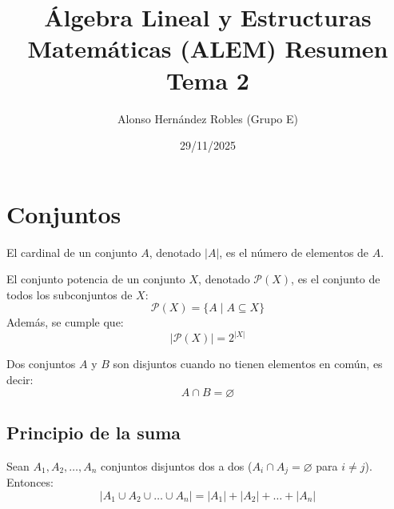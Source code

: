 \documentclass[a4paper,12pt]{article}
\title{Álgebra Lineal y Estructuras Matemáticas (ALEM) Resumen Tema 2}
\author{Alonso Hernández Robles (Grupo E)}
\date{29/11/2025}
\begin{document}
\maketitle

\tableofcontents
\newpage

\section{Conjuntos}

\begin{procedimiento}[title=Cardinal de un conjunto]
El cardinal de un conjunto $A$, denotado $|A|$, es el número de elementos de $A$.
\end{procedimiento}

\begin{procedimiento}[title=Conjunto potencia]
El conjunto potencia de un conjunto $X$, denotado $\mathcal{P}(X)$, es el conjunto de todos los subconjuntos de $X$:
\[
\mathcal{P}(X) = \{ A \mid A \subseteq X \}
\]
Además, se cumple que:
\[
|\mathcal{P}(X)| = 2^{|X|}
\]
\end{procedimiento}

\begin{procedimiento}[title=Conjuntos disjuntos]
Dos conjuntos $A$ y $B$ son disjuntos cuando no tienen elementos en común, es decir:
\[
A \cap B = \varnothing
\]
\end{procedimiento}

\subsection{Principio de la suma}

\begin{procedimiento}[title=Principio de la suma]
Sean $A_1, A_2, \dots, A_n$ conjuntos disjuntos dos a dos ($A_i \cap A_j = \varnothing$ para $i \neq j$). Entonces:
\[
|A_1 \cup A_2 \cup \dots \cup A_n| = |A_1| + |A_2| + \dots + |A_n|
\]
\end{procedimiento}
\end{document}
